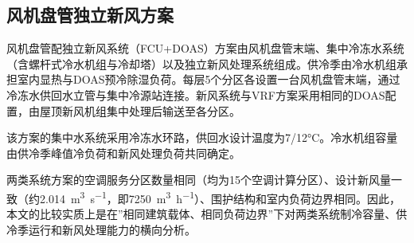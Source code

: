 \subsection{风机盘管独立新风方案}

风机盘管配独立新风系统（FCU+DOAS）方案由风机盘管末端、集中冷冻水系统（含螺杆式冷水机组与冷却塔）以及独立新风处理系统组成。供冷季由冷水机组承担室内显热与DOAS预冷除湿负荷。每层5个分区各设置一台风机盘管末端，通过冷冻水供回水立管与集中冷源站连接。新风系统与VRF方案采用相同的DOAS配置，由屋顶新风机组集中处理后输送至各分区。

该方案的集中水系统采用冷冻水环路，供回水设计温度为7/12\si{\degreeCelsius}。冷水机组容量由供冷季峰值冷负荷和新风处理负荷共同确定。

两类系统方案的空调服务分区数量相同（均为15个空调计算分区）、设计新风量一致（约\SI{2.014}{\meter^3\per\second}，即\SI{7250}{\meter^3\per\hour}）、围护结构和室内负荷边界相同。因此，本文的比较实质上是在”相同建筑载体、相同负荷边界”下对两类系统制冷容量、供冷季运行和新风处理能力的横向分析。





